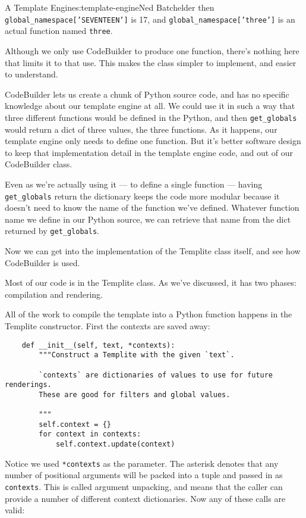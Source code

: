 \begin{aosachapter}{A Template Engine}{s:template-engine}{Ned Batchelder}
then \texttt{global\_namespace{[}'SEVENTEEN'{]}} is 17, and
\texttt{global\_namespace{[}'three'{]}} is an actual function named
\texttt{three}.

Although we only use CodeBuilder to produce one function, there's
nothing here that limits it to that use. This makes the class simpler to
implement, and easier to understand.

CodeBuilder lets us create a chunk of Python source code, and has no
specific knowledge about our template engine at all. We could use it in
such a way that three different functions would be defined in the
Python, and then \texttt{get\_globals} would return a dict of three
values, the three functions. As it happens, our template engine only
needs to define one function. But it's better software design to keep
that implementation detail in the template engine code, and out of our
CodeBuilder class.

Even as we're actually using it --- to define a single function ---
having \texttt{get\_globals} return the dictionary keeps the code more
modular because it doesn't need to know the name of the function we've
defined. Whatever function name we define in our Python source, we can
retrieve that name from the dict returned by \texttt{get\_globals}.

Now we can get into the implementation of the Templite class itself, and
see how CodeBuilder is used.

\label{the-templite-class-implementation}

Most of our code is in the Templite class. As we've discussed, it has
two phases: compilation and rendering.

\label{compiling}

All of the work to compile the template into a Python function happens
in the Templite constructor. First the contexts are saved away:

\begin{verbatim}
    def __init__(self, text, *contexts):
        """Construct a Templite with the given `text`.

        `contexts` are dictionaries of values to use for future renderings.
        These are good for filters and global values.

        """
        self.context = {}
        for context in contexts:
            self.context.update(context)
\end{verbatim}

Notice we used \texttt{*contexts} as the parameter. The asterisk denotes
that any number of positional arguments will be packed into a tuple and
passed in as \texttt{contexts}. This is called argument unpacking, and
means that the caller can provide a number of different context
dictionaries. Now any of these calls are valid:


\end{aosachapter}
